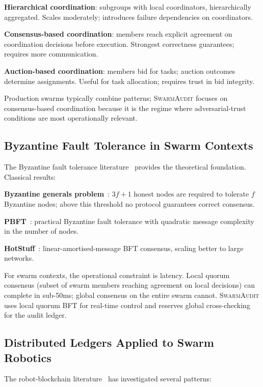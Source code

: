 \documentclass[sigconf,nonacm]{acmart}
\begin{document}
\textbf{Hierarchical coordination}: subgroups with local
coordinators, hierarchically aggregated. Scales moderately;
introduces failure dependencies on coordinators.

\textbf{Consensus-based coordination}: members reach explicit
agreement on coordination decisions before execution. Strongest
correctness guarantees; requires more communication.

\textbf{Auction-based coordination}: members bid for tasks;
auction outcomes determine assignments. Useful for task
allocation; requires trust in bid integrity.

Production swarms typically combine patterns; \textsc{SwarmAudit}
focuses on consensus-based coordination because it is the regime
where adversarial-trust conditions are most operationally relevant.

\subsection{Byzantine Fault Tolerance in Swarm Contexts}

The Byzantine fault tolerance literature~\cite{lamport1982byzantine,
castro2002pbft,yin2019hotstuff} provides the theoretical
foundation. Classical results:

\textbf{Byzantine generals problem}~\cite{lamport1982byzantine}:
$3f+1$ honest nodes are required to tolerate $f$ Byzantine nodes;
above this threshold no protocol guarantees correct consensus.

\textbf{PBFT}~\cite{castro2002pbft}: practical Byzantine fault
tolerance with quadratic message complexity in the number of
nodes.

\textbf{HotStuff}~\cite{yin2019hotstuff}: linear-amortised-message
BFT consensus, scaling better to large networks.

For swarm contexts, the operational constraint is latency. Local
quorum consensus (subset of swarm members reaching agreement on
local decisions) can complete in sub-50ms; global consensus on
the entire swarm cannot. \textsc{SwarmAudit} uses local quorum
BFT for real-time control and reserves global cross-checking for
the audit ledger.

\subsection{Distributed Ledgers Applied to Swarm Robotics}

The robot-blockchain
literature~\cite{kapitonov2024robotchain,strobel2018robotswarmblock}
has investigated several patterns:
\end{document}
